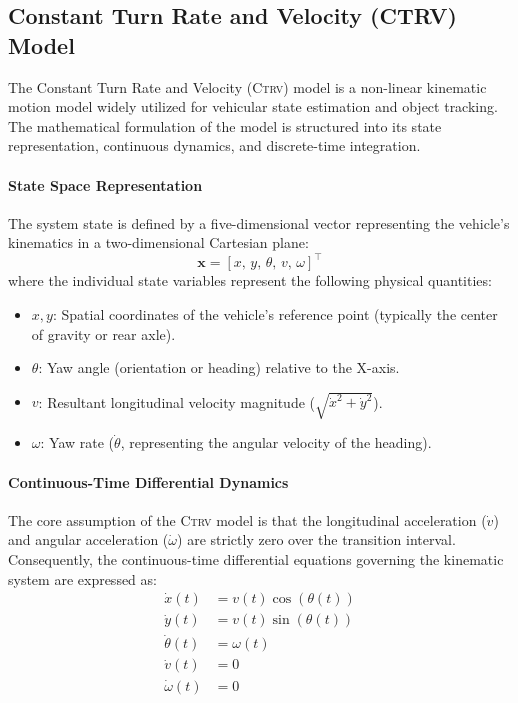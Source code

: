 \subsection{Constant Turn Rate and Velocity (CTRV) Model}
\label{sec:ctrv_theory}

The Constant Turn Rate and Velocity (\textsc{Ctrv}) model is a non-linear kinematic motion model widely utilized for vehicular state estimation and object tracking.%
The mathematical formulation of the model is structured into its state representation, continuous dynamics, and discrete-time integration.

\paragraph{State Space Representation}
The system state is defined by a five-dimensional vector representing the vehicle's kinematics in a two-dimensional Cartesian plane:
\begin{equation}
	\mathbf{x} = [x, \, y, \, \theta, \, v, \, \omega]^\top
	\label{eq:ctrv_state}
\end{equation}
where the individual state variables represent the following physical quantities:
\begin{itemize}
	\item $x, y$: Spatial coordinates of the vehicle's reference point (typically the center of gravity or rear axle).
	\item $\theta$: Yaw angle (orientation or heading) relative to the X-axis.
	\item $v$: Resultant longitudinal velocity magnitude ($\sqrt{\dot{x}^2 + \dot{y}^2}$).
	\item $\omega$: Yaw rate ($\dot{\theta}$, representing the angular velocity of the heading).
\end{itemize}

\paragraph{Continuous-Time Differential Dynamics}
The core assumption of the \textsc{Ctrv} model is that the longitudinal acceleration ($\dot{v}$) and angular acceleration ($\dot{\omega}$) are strictly zero over the transition interval. Consequently, the continuous-time differential equations governing the kinematic system are expressed as:
\begin{align}
	\dot{x}(t) &= v(t) \cos(\theta(t)) \\
	\dot{y}(t) &= v(t) \sin(\theta(t)) \\
	\dot{\theta}(t) &= \omega(t) \\
	\dot{v}(t) &= 0 \\
	\dot{\omega}(t) &= 0
\end{align}

